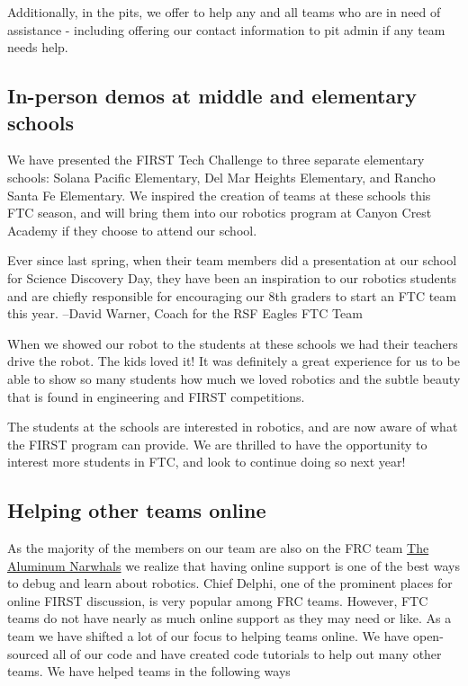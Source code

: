 Additionally, in the pits, we offer to help any and all teams who are in need of assistance - including offering our contact information to pit admin if any team needs help.

\subsection{In-person demos at middle and elementary schools}

We have presented the FIRST Tech Challenge to three separate elementary schools: Solana Pacific Elementary, Del Mar Heights Elementary, and Rancho Santa Fe Elementary. We inspired the creation of teams at these schools this FTC season, and will bring them into our robotics program at Canyon Crest Academy if they choose to attend our school.

\begin{fancyquotes}
Ever since last spring, when their team members did a presentation at our school for Science Discovery Day, they have been an inspiration to our robotics students and are chiefly responsible for encouraging our 8th graders to start an FTC team this year. \newline \newline
--David Warner, Coach for the RSF Eagles FTC Team
\end{fancyquotes}

When we showed our robot to the students at these schools we had their teachers drive the robot. The kids loved it! It was definitely a great experience for us to be able to show so many students how much we loved robotics and the subtle beauty that is found in engineering and FIRST competitions. 

The students at the schools are interested in robotics, and are now aware of what the FIRST program can provide. We are thrilled to have the opportunity to interest more students in FTC, and look to continue doing so next year!

\subsection{Helping other teams online}
As the majority of the members on our team are also on the FRC team \underline{The Aluminum Narwhals} we realize that having online support is one of the best ways to debug and learn about robotics. Chief Delphi, one of the prominent places for online FIRST discussion, is very popular among FRC teams. However, FTC teams do not have nearly as much online support as they may need or like. As a team we have shifted a lot of our focus to helping teams online. We have open-sourced all of our code and have created code tutorials to help out many other teams. We have helped teams in the following ways

